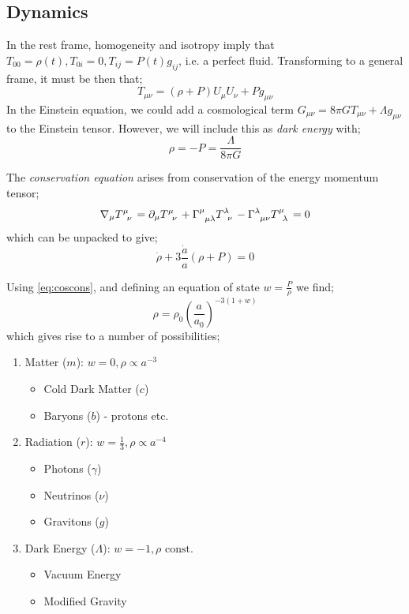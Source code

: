 \subsection{Dynamics}
In the rest frame, homogeneity and isotropy imply that $T_{00} = \rho(t), T_{0i} = 0, T_{ij} = P(t) g_{ij}$, i.e. a perfect fluid. Transforming to a general frame, it must be then that;
\begin{equation}
T_{\mu \nu} = (\rho + P)U_{\mu}U_{\nu} + P g_{\mu \nu}
\end{equation}
In the Einstein equation, we could add a cosmological term $G_{\mu \nu} = 8\pi G T_{\mu \nu} + \Lambda g_{\mu \nu}$ to the Einstein tensor. However, we will include this as \emph{dark energy} with;
\begin{equation}
\rho = - P = \frac{\Lambda}{8\pi G}
\end{equation}
\begin{definitionbox}
The \emph{conservation equation} arises from conservation of the energy momentum tensor;
\begin{equation}
\nabla_\mu T\indices{^\mu_\nu} = \del_\mu T\indices{^\mu_\nu} + \Gamma\indices{^\mu_{\mu \lambda}}T\indices{^\lambda_\nu} - \Gamma\indices{^\lambda_{\mu\nu}}T\indices{^\mu_\lambda} = 0
\end{equation}
which can be unpacked to give;
\begin{equation}
\label{eq:coscons}
\dot{\rho} + 3\frac{\dot{a}}{a}(\rho + P) = 0
\end{equation}
\end{definitionbox}
Using \eqref{eq:coscons}, and defining an equation of state $w = \tfrac{P}{\rho}$ we find;
\begin{equation}
\rho = \rho_0 \left(\frac{a}{a_0}\right)^{-3(1+w)}
\end{equation}
which gives rise to a number of possibilities;
\begin{examplebox}
\begin{enumerate}
\item Matter ($m$): $w = 0, \rho \propto a^{-3}$
\begin{itemize}
\item Cold Dark Matter ($c$)
\item Baryons ($b$) - protons etc. 
\end{itemize}
\item Radiation ($r$): $w = \tfrac{1}{3}, \rho \propto a^{-4}$
\begin{itemize}
\item Photons ($\gamma$)
\item Neutrinos ($\nu$)
\item Gravitons ($g$)
\end{itemize}
\item Dark Energy ($\Lambda$): $w = -1, \rho \text{ const.}$
\begin{itemize}
\item Vacuum Energy
\item Modified Gravity
\end{itemize}
\end{enumerate}
\end{examplebox}

